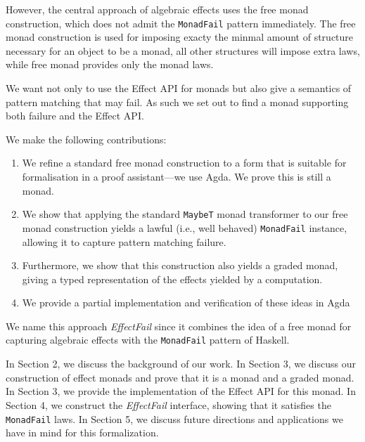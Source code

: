 \documentclass[10pt]{article}
\theoremstyle{definition}
\theoremstyle{remark}
\newcommand{\dnoteM}[1]{\textcolor{blue}{\sidenote{\textcolor{blue}{#1}}}}
\begin{document}
However, the central approach of algebraic effects uses the
free monad construction,
which does not admit the \texttt{MonadFail} pattern immediately.
The free monad construction is used for imposing exacty the minmal amount of structure necessary for an object to be a monad, all other structures will impose extra laws, while free monad provides only the monad laws.

We want not only to use the Effect API for monads
but also give a semantics of pattern matching that may fail.
As such we set out to find a monad supporting both failure and the Effect API.




We make the following contributions:
%
\begin{enumerate}
\item We refine a standard free monad construction to a form that is
  suitable for formalisation in a proof assistant---we use Agda. We
  prove this is still a monad.

\item We show that applying the standard \texttt{MaybeT} monad
  transformer to our free monad construction yields a lawful
(i.e., well behaved) \texttt{MonadFail} instance, allowing
it to capture pattern matching failure.

\item Furthermore, we show that this construction also
yields a graded monad, giving a typed representation of
the effects yielded by a computation.

\item We provide a partial implementation and verification of these ideas in Agda \cite{repo}

\end{enumerate}
%
We name this approach \textit{EffectFail} since it combines the idea
of a free monad for capturing algebraic effects with the
\texttt{MonadFail} pattern of Haskell.

In Section 2, we discuss the background of our work.
In Section 3, we discuss our construction of effect monads and prove that it is a monad and a graded monad.
In Section 3, we provide the implementation of the Effect API for this monad.
In Section 4, we construct the \emph{EffectFail} interface, showing
that it satisfies the \texttt{MonadFail} laws.
In Section 5, we discuss future directions and applications we have in mind for this formalization.
\end{document}
